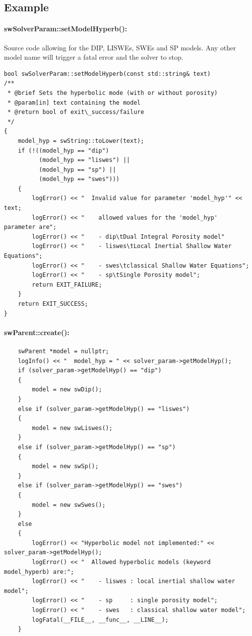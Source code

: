 \subsection{Example}
\paragraph{swSolverParam::setModelHyperb():}
 Source code allowing for the DIP, LISWEs, SWEs and SP models. Any other model name will trigger a fatal error and the solver to stop.
\begin{lstlisting}
bool swSolverParam::setModelHyperb(const std::string& text)
/**
 * @brief Sets the hyperbolic mode (with or without porosity)
 * @param[in] text containing the model
 * @return bool of exit\_success/failure
 */
{
    model_hyp = swString::toLower(text);
    if (!((model_hyp == "dip")
          (model_hyp == "liswes") ||
          (model_hyp == "sp") ||
          (model_hyp == "swes")))
    {
        logError() << "  Invalid value for parameter 'model_hyp'" << text;
        logError() << "    allowed values for the 'model_hyp' parameter are";
        logError() << "    - dip\tDual Integral Porosity model"
        logError() << "    - liswes\tLocal Inertial Shallow Water Equations";
        logError() << "    - swes\tclassical Shallow Water Equations";
        logError() << "    - sp\tSingle Porosity model";
        return EXIT_FAILURE;
    }
    return EXIT_SUCCESS;
}
\end{lstlisting}
%
%
\paragraph{swParent::create():}
\begin{lstlisting}
    swParent *model = nullptr;
    logInfo() << "  model_hyp = " << solver_param->getModelHyp();
    if (solver_param->getModelHyp() == "dip")
    {
        model = new swDip();
    }
    else if (solver_param->getModelHyp() == "liswes")
    {
        model = new swLiswes();
    }
    else if (solver_param->getModelHyp() == "sp")
    {
        model = new swSp();
    }
    else if (solver_param->getModelHyp() == "swes")
    {
        model = new swSwes();
    }
    else
    {
        logError() << "Hyperbolic model not implemented:" << solver_param->getModelHyp();
        logError() << "  Allowed hyperbolic models (keyword model_hyperb) are:";
        logError() << "    - liswes : local inertial shallow water model";
        logError() << "    - sp     : single porosity model";
        logError() << "    - swes   : classical shallow water model";
        logFatal(__FILE__, __func__, __LINE__);
    }

\end{lstlisting}
%
%
%
